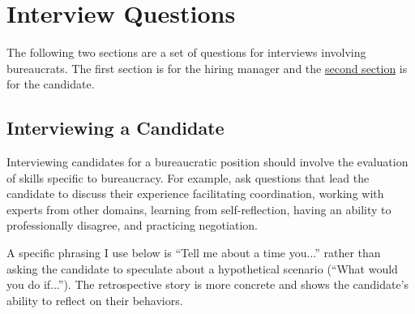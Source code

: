 \chapter{Interview Questions}

The following two sections are a set of questions for interviews involving bureaucrats. The first section is for the hiring manager and the \hyperref[sec:moving-to-new-team]{second section}%
\iftoggle{haspagenumbers}{(starting on page~\pageref{sec:moving-to-new-team})}{} is for the candidate.


\section*{Interviewing a Candidate}

Interviewing candidates for a bureaucratic position should involve the evaluation of skills specific to bureaucracy. For example, ask questions that lead the candidate to discuss  their experience facilitating coordination, working with experts from other domains, learning from self-reflection, having an ability to professionally disagree, and practicing negotiation. 

A specific phrasing I use below is ``Tell me about a time you...'' rather than asking the candidate to speculate about a hypothetical scenario (``What would you do if...''). The retrospective story is more concrete and shows the candidate's ability to reflect on their behaviors.


